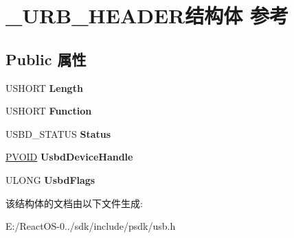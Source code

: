 \hypertarget{struct___u_r_b___h_e_a_d_e_r}{}\section{\+\_\+\+U\+R\+B\+\_\+\+H\+E\+A\+D\+E\+R结构体 参考}
\label{struct___u_r_b___h_e_a_d_e_r}
\subsection*{Public 属性}
\begin{DoxyCompactItemize}
\item 
\mbox{\label{struct___u_r_b___h_e_a_d_e_r_a215e2bd636153a78a1e57de893610a67}} 
U\+S\+H\+O\+RT {\bfseries Length}
\item 
\mbox{\label{struct___u_r_b___h_e_a_d_e_r_a08ef8cea1fef762b034311cacb177808}} 
U\+S\+H\+O\+RT {\bfseries Function}
\item 
\mbox{\label{struct___u_r_b___h_e_a_d_e_r_a82a420183cf9115aeebde367e31b08c6}} 
U\+S\+B\+D\+\_\+\+S\+T\+A\+T\+US {\bfseries Status}
\item 
\mbox{\label{struct___u_r_b___h_e_a_d_e_r_a34b1177857e8fbd52f95b4d6f1a07f67}} 
\hyperlink{interfacevoid}{P\+V\+O\+ID} {\bfseries Usbd\+Device\+Handle}
\item 
\mbox{\label{struct___u_r_b___h_e_a_d_e_r_ac0d018d26cfba728ed8a284c788a4a47}} 
U\+L\+O\+NG {\bfseries Usbd\+Flags}
\end{DoxyCompactItemize}


该结构体的文档由以下文件生成\+:\begin{DoxyCompactItemize}
\item 
E\+:/\+React\+O\+S-\/0../sdk/include/psdk/usb.\+h\end{DoxyCompactItemize}
